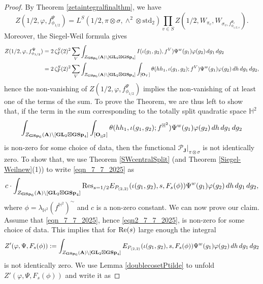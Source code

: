 \documentclass[11pt, reqno]{amsart}
\theoremstyle{plain}
\theoremstyle{definition}
\theoremstyle{remark}
\theoremstyle{plain}
\def\A{{\bf A}}
\def\GSp{{\mathbf{GSp}}}
\def\GL{\mathbf{GL}}
\begin{document}
\begin{proof}
By Theorem \ref{zetaintegralfinalthm}, we have $$ Z(1/2,\varphi, f^\Psi_{\phi_{1/2}}) =L^S(1/2, \pi \otimes \sigma, \wedge^2 \otimes  \mathrm{std}_2) \prod_{v \in S} Z\left(1/2,W_{\pi_v}, W_{\sigma_v,f_{\phi_{1/2,v}}^{\Psi_v}} \right).$$ Moreover, the Siegel-Weil formula gives
\begin{align*}
    Z(1/2,\varphi, f^\Psi_{\phi_{1/2}}) &= 2 \,\zeta^S_F(2)^2  \sum_V \int_{Z_{\GSp_6}(\A)\backslash [\GL_2\boxtimes \GSp_4]} I(\iota( g_1  , g_2), f^V) \Psi^w( g_1 ) \varphi(g_2)\, dg_1\,dg_2 \\ &= 2 \,\zeta^S_F(2)^2  \sum_V \int_{Z_{\GSp_6}(\A)\backslash [\GL_2\boxtimes \GSp_4]} \int_{[\mathbf{O}_V]} \theta(h h_1, \iota( g_1  , g_2) ; f^V) \Psi^w( g_1 ) \varphi(g_2) \, d h \, dg_1\,dg_2,
\end{align*}
hence the non-vanishing of $Z(1/2,\varphi, f^\Psi_{\phi_{1/2}})$ implies the non-vanishing of at least one of the terms of the sum. To prove the Theorem, we are thus left to show that, if the term in the sum corresponding to the totally split quadratic space $\mathbb{H}^2$ \begin{align}\label{eqn_7_7_2025}
    \int_{Z_{\GSp_6}(\A)\backslash [\GL_2\boxtimes \GSp_4]} \int_{[\mathbf{O}_{\mathbb{H}^2}]} \theta(h h_1, \iota( g_1  , g_2) ; f^{\mathbb{H}^2}) \Psi^w( g_1 ) \varphi(g_2) \, d h \, dg_1\,dg_2 
\end{align} is non-zero for some choice of data, then the functional $\mathcal{P}_\mathbf{J}|_{\pi\otimes\sigma}$ is not identically zero.
To show that, we use Theorem \ref{SWcentralSplit} (and Theorem \ref{Siegel-Weilnew}(1)) to write \eqref{eqn_7_7_2025} as 
  \begin{align}\label{eqn2_7_7_2025}
    c \cdot \int_{Z_{\GSp_6}(\A)\backslash [\GL_2\boxtimes \GSp_4]} {\rm Res}_{s=1/2} E_{P_{(2,2)}}(\iota(g_1,g_2), s, F_s(\phi)) \Psi^w( g_1 ) \varphi(g_2) \, d h \, dg_1\,dg_2, 
\end{align}  
where $\phi = \lambda_{\mathbb{H}^2}(f^{\mathbb{H}^2})^{\sim}$ and $c$ is a non-zero constant. We can now prove our claim. Assume that \eqref{eqn_7_7_2025}, hence \eqref{eqn2_7_7_2025}, is non-zero for some choice of data. This implies that for ${\rm Re}(s)$ large enough the integral 
$$Z'(\varphi, \Psi, F_s(\phi)): = \int_{Z_{\GSp_6}(\A)\backslash [\GL_2\boxtimes \GSp_4]} E_{P_{(2,2)}}(\iota(g_1,g_2), s, F_s(\phi)) \Psi^w( g_1 ) \varphi(g_2) \, d h \, dg_1\,dg_2$$
is not identically zero. We use Lemma \ref{doublecosetPtilde} to unfold $Z'(\varphi, \Psi, F_s(\phi))$ and write it as

\end{proof}
\end{document}
